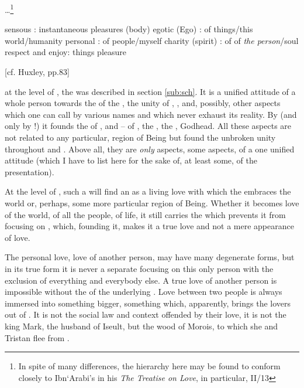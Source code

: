 
\ldots\footnote{In spite of many differences, 
the hierarchy here may be found to conform closely to Ibn`Arabi's in his {\em 
The Treatise on Love}, in particular, II/13}

  {sensous : instantaneous pleasures (body)}
  {egotic (Ego) : of things/this world/humanity}
  {personal : of people/{\co myself}}
{charity (spirit) : of }
  {of {\em the person}/soul}
  {respect and enjoy: things}
  {pleasure}
  
[cf. Huxley, pp.83]


\pa \inv 
{} at the level of , the  was 
described in section \ref{sub:sch}. It is a unified attitude of a 
whole person towards the  of the , the 
unity of , ,  and, possibly, other 
aspects which one can call by various names and which never exhaust 
its reality. By  (and 
only by !) it founds the  of
,  and  -- of 
, the 
, the , Godhead. 
All these aspects are not related to any particular, 
 region of Being but found the unbroken unity 
throughout  and . Above all, they are {\em 
only} aspects, some aspects, of a one unified attitude (which I have 
to list here for the sake of, at least some,  of the 
presentation).

\pa\label{pa:persloveB} \mine
At the level of , such a  will find an 
 as a living love 
with which the  embraces the world or, perhaps, some more 
particular region of Being. 
Whether it becomes love of the 
world, of all the people, of life, it still carries the  
which prevents it from focusing on , which, founding it, 
makes it a true love and not a mere appearance of love.

\subpa
The personal love, 
love of another person, may have many degenerate forms, but in its 
true form it is never a separate focusing on this only person with the 
exclusion of everything and everybody else. A true love of another 
person is impossible without the  of the underlying 
. Love between two people is always immersed into something 
bigger, something which, apparently, brings the lovers out of 
. It is not the social law and context offended by 
their love, it is 
not the king Mark, the husband of Iseult, but the 
wood of Morois, to which she and Tristan flee from . 


